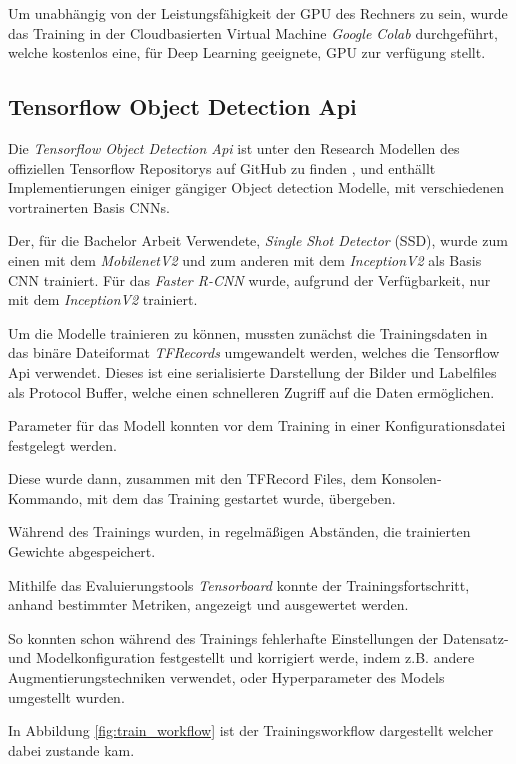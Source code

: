 Um unabhängig von der Leistungsfähigkeit der GPU des 
Rechners zu sein, wurde das Training in der Cloudbasierten
Virtual Machine \textit{Google Colab} \cite{colab} durchgeführt,
welche kostenlos eine, für Deep Learning geeignete, GPU
zur verfügung stellt.



\subsection{Tensorflow Object Detection Api}

Die \textit{Tensorflow Object Detection Api} ist unter den
Research Modellen des offiziellen Tensorflow
Repositorys auf GitHub zu finden \cite{tfobjdet},
und enthällt Implementierungen
einiger gängiger Object detection Modelle, mit verschiedenen 
vortrainerten Basis CNNs.

Der, für die Bachelor Arbeit Verwendete, \textit{Single 
Shot Detector} (SSD), wurde zum einen mit dem 
\textit{MobilenetV2} und zum anderen mit dem 
\textit{InceptionV2} als Basis CNN trainiert.
Für das \textit{Faster R-CNN} wurde, aufgrund 
der Verfügbarkeit, nur mit dem \textit{InceptionV2}
trainiert.

Um die Modelle trainieren zu können, mussten zunächst die 
Trainingsdaten in das binäre Dateiformat \textit{TFRecords} 
umgewandelt werden, welches die Tensorflow Api verwendet.
Dieses ist eine serialisierte 
Darstellung der Bilder und Labelfiles als Protocol Buffer,
welche einen schnelleren Zugriff auf die Daten ermöglichen.

Parameter für das Modell konnten vor dem Training 
in einer Konfigurationsdatei festgelegt werden.

Diese wurde dann, zusammen mit den TFRecord Files, 
dem Konsolen-Kommando, mit dem das Training 
gestartet wurde, übergeben.

Während des Trainings wurden, in regelmäßigen 
Abständen, die trainierten Gewichte abgespeichert.

Mithilfe das Evaluierungstools \textit{Tensorboard}
konnte der Trainingsfortschritt, anhand bestimmter
Metriken, angezeigt und ausgewertet werden.

So konnten schon während des Trainings fehlerhafte
Einstellungen der Datensatz- und 
Modelkonfiguration festgestellt 
und korrigiert werde, indem z.B. andere
Augmentierungstechniken verwendet,
oder Hyperparameter des Models umgestellt wurden.

In Abbildung \ref{fig:train_workflow}
ist der Trainingsworkflow dargestellt 
welcher dabei zustande kam.

